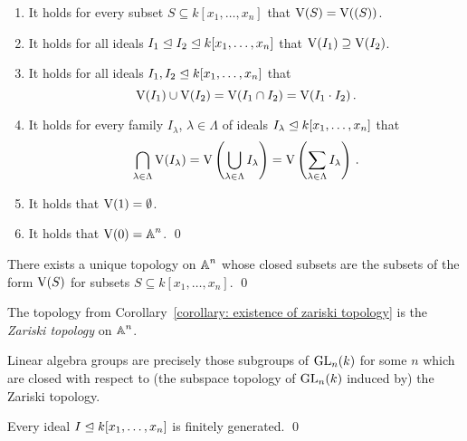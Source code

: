 \begin{lemma}
  \leavevmode
  \begin{enumerate}
    \item
      It holds for every subset $S \subseteq k[x_1, \dotsc, x_n]$ that $\operatorname{V}(S) = \operatorname{V}( (S) )$.
    \item
      It holds for all ideals $I_1 \trianglelefteq I_2 \trianglelefteq k[x_1, \dotsc, x_n]$ that $\operatorname{V}(I_1) \supseteq \operatorname{V}(I_2)$.
    \item
      It holds for all ideals $I_1, I_2 \trianglelefteq k[x_1, \dotsc, x_n]$ that
      \[
          \operatorname{V}(I_1) \cup \operatorname{V}(I_2)
        = \operatorname{V}(I_1 \cap I_2)
        = \operatorname{V}(I_1 \cdot I_2) \,.
      \]
    \item
      It holds for every family $I_\lambda$, $\lambda \in \Lambda$ of ideals $I_\lambda \trianglelefteq k[x_1, \dotsc, x_n]$ that
      \[
          \bigcap_{\lambda \in \Lambda} \operatorname{V}(I_\lambda)
        = \operatorname{V}\left( \bigcup_{\lambda \in \Lambda} I_\lambda \right)
        = \operatorname{V}\left( \sum_{\lambda \in \Lambda} I_\lambda \right) \,.
      \]
    \item
      It holds that $\operatorname{V}(1) = \emptyset$.
    \item
      It holds that $\operatorname{V}(0) = \operatorname{\mathbb{A}}^n$.
    \qed
  \end{enumerate}
\end{lemma}


\begin{corollary}
  \label{corollary: existence of zariski topology}
  There exists a unique topology on $\operatorname{\mathbb{A}}^n$ whose closed subsets are the subsets of the form $\operatorname{V}(S)$ for subsets $S \subseteq k[x_1, \dotsc, x_n]$.
  \qed
\end{corollary}


\begin{definition}
  The topology from Corollary~\ref{corollary: existence of zariski topology} is the \emph{Zariski topology} on $\operatorname{\mathbb{A}}^n$.
\end{definition}


\begin{remark}
  Linear algebra groups are precisely those subgroups of $\operatorname{GL}_n(k)$ for some $n$ which are closed with respect to (the subspace topology of $\operatorname{GL}_n(k)$ induced by) the Zariski topology.
\end{remark}


\begin{theorem}[Hilbert]
  Every ideal $I \trianglelefteq k[x_1, \dotsc, x_n]$ is finitely generated.
  \qed
\end{theorem}


